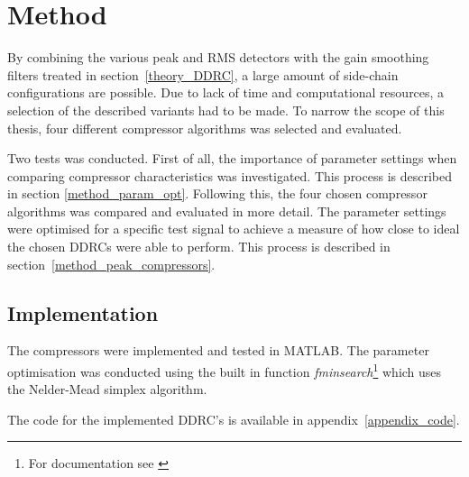 \documentclass[../main2.tex]{subfiles}
\providecommand{\rootdir}{..}
\begin{document}
\section{Method}\label{method}
By combining the various peak and RMS detectors with the gain smoothing filters treated in section~\ref{theory_DDRC}, a large amount of side-chain configurations are possible. Due to lack of time and computational resources, a selection of the described variants had to be made. To narrow the scope of this thesis, four different compressor algorithms was selected and evaluated.

Two tests was conducted. First of all, the importance of parameter settings when comparing compressor characteristics was investigated. This process is described in section \ref{method_param_opt}. Following this, the four chosen compressor algorithms was compared and evaluated in more detail. The parameter settings were optimised for a specific test signal to achieve a measure of how close to ideal the chosen DDRCs were able to perform. This process is described in section~\ref{method_peak_compressors}.

\subsection{Implementation} \label{method_implementation}
The compressors were implemented and tested in MATLAB\textsuperscript{\textregistered}. The parameter optimisation was conducted using the built in function \emph{fminsearch}\footnote{For documentation see \cite{fminsearch}} which uses the Nelder-Mead simplex algorithm. 

The code for the implemented DDRC's is available in appendix~\ref{appendix_code}.



\end{document}
